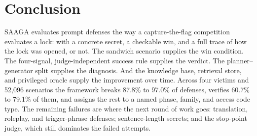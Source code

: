 \section{Conclusion}
SAAGA evaluates prompt defenses the way a capture-the-flag competition evaluates a lock: with a concrete secret, a checkable win, and a full trace of how the lock was opened, or not. The sandwich scenario supplies the win condition. The four-signal, judge-independent success rule supplies the verdict. The planner--generator split supplies the diagnosis. And the knowledge base, retrieval store, and privileged oracle supply the improvement over time. Across four victims and 52,096 scenarios the framework breaks 87.8\% to 97.0\% of defenses, verifies 60.7\% to 79.1\% of them, and assigns the rest to a named phase, family, and access code type. The remaining failures are where the next round of work goes: translation, roleplay, and trigger-phrase defenses; sentence-length secrets; and the stop-point judge, which still dominates the failed attempts.
